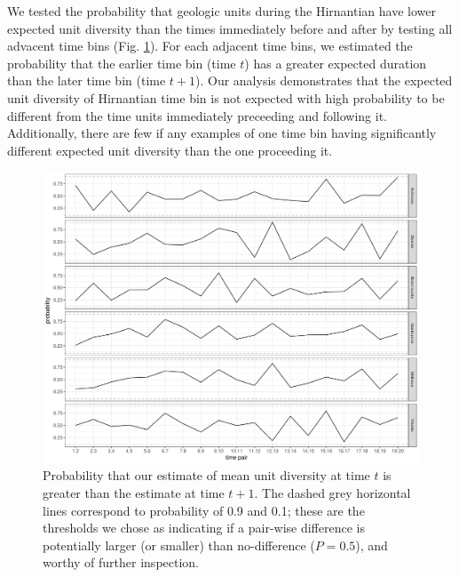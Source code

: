 \documentclass[12pt,letterpaper]{article}
\begin{document}
We tested the probability that geologic units during the Hirnantian have lower expected unit diversity than the times immediately before and after by testing all advacent time bins (Fig. \ref{fig:diff_div}). For each adjacent time bins, we estimated the probability that the earlier time bin (time \(t\)) has a greater expected duration than the later time bin (time \(t + 1\)). Our analysis demonstrates that the expected unit diversity of Hirnantian time bin is not expected with high probability to be different from the time units immediately preceeding and following it. Additionally, there are few if any examples of one time bin having significantly different expected unit diversity than the one proceeding it.
\begin{figure}[ht]
  \centering
  \includegraphics[width=\textwidth,height=0.5\textheight,keepaspectratio=true]{figure/unitdiv_diff_diversity}
  \caption{Probability that our estimate of mean unit diversity at time \(t\) is greater than the estimate at time \(t + 1\). The dashed grey horizontal lines correspond to probability of 0.9 and 0.1; these are the thresholds we chose as indicating if a pair-wise difference is potentially larger (or smaller) than no-difference (\(P = 0.5\)), and worthy of further inspection.}
  \label{fig:diff_div}
\end{figure}

\end{document}
